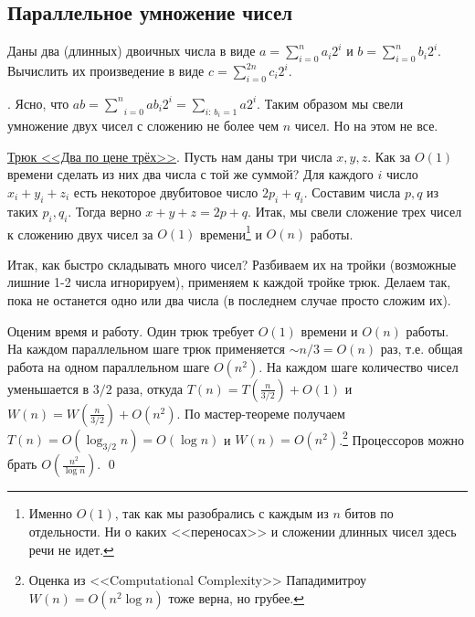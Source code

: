 \subsection{Параллельное умножение чисел}
\begin{problem*}
	Даны два (длинных) двоичных числа в виде $a = \sum_{i=0}^n a_i 2^i$ и $b = \sum_{i=0}^n b_i 2^i$. Вычислить их произведение в виде $c = \sum_{i=0}^{2n} c_i 2^i$.
\end{problem*}

.{} Ясно, что $ab = \underset{i=0}{\overset{n}{\sum}}a b_i 2^i = \underset{i: \, b_i=1}{\sum} a 2^i$. Таким образом мы свели умножение двух чисел с сложению не более чем $n$ чисел. Но на этом не все.

\underline{Трюк <<Два по цене трёх>>}. Пусть нам даны три числа $x, y, z$. Как за $O(1)$ времени сделать из них два числа с той же суммой? Для каждого $i$ число $x_i + y_i + z_i$ есть некоторое двубитовое число $2p_i + q_i$. Составим числа $p,q$ из таких $p_i, q_i$. Тогда верно $x+y+z = 2p+q$. Итак, мы свели сложение трех чисел к сложению двух чисел за $O(1)$ времени\footnote{Именно $O(1)$, так как мы разобрались с каждым из $n$ битов по отдельности. Ни о каких <<переносах>> и сложении длинных чисел здесь речи не идет.} и $O(n)$ работы.

Итак, как быстро складывать много чисел? Разбиваем их на тройки (возможные лишние 1-2 числа игнорируем), применяем к каждой тройке трюк. Делаем так, пока не останется одно или два числа (в последнем случае просто сложим их).

Оценим время и работу. Один трюк требует $O(1)$ времени и $O(n)$ работы. На каждом параллельном шаге трюк применяется $\sim n/3 = O(n)$ раз, т.е. общая работа на одном параллельном шаге $O(n^2)$. На каждом шаге количество чисел уменьшается в $3/2$ раза, откуда $T(n) = T\left(\frac{n}{3/2}\right) + O(1)$ и $W(n) = W(\frac{n}{3/2}) + O(n^2)$. По мастер-теореме получаем $T(n) = O(\log_{3/2}n) = O(\log n)$ и $W(n) = O(n^2)$.\footnote{Оценка из <<Computational Complexity>> Пападимитроу $W(n) = O(n^2\log n)$ тоже верна, но грубее.} Процессоров можно брать $O\left(\frac{n^2}{\log n}\right)$. \qed
